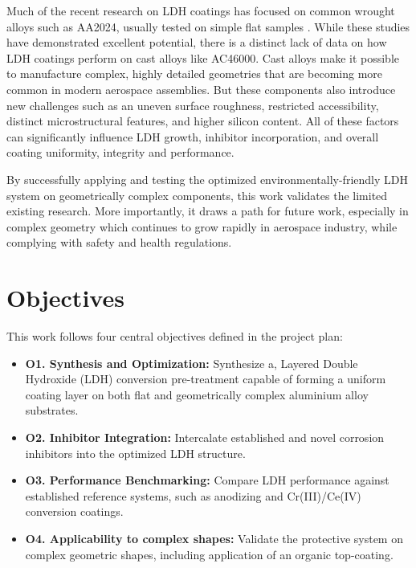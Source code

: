 \documentclass[11pt,twoside,a4paper]{report}
\begin{document}
Much of the recent research on LDH coatings has focused on common wrought alloys such as AA2024, usually tested on simple flat samples \cite{Tedim2014,Tedim2011,He2020,Bouali2020}. While these studies have demonstrated excellent potential, there is a distinct lack of data on how LDH coatings perform on cast alloys like AC46000. Cast alloys make it possible to manufacture complex, highly detailed geometries that are becoming more common in modern aerospace assemblies. But these components also introduce new challenges such as an uneven surface roughness, restricted accessibility, distinct microstructural features, and higher silicon content. All of these factors can significantly influence LDH growth, inhibitor incorporation, and overall coating uniformity, integrity and performance.

By successfully applying and testing the optimized environmentally-friendly LDH system on geometrically complex components, this work validates the limited existing research. More importantly, it draws a path for future work, especially in complex geometry which continues to grow rapidly in aerospace industry, while complying with safety and health regulations.

\section{Objectives}
This work follows four central objectives defined in the project plan:
\begin{itemize}
    \item \textbf{O1. Synthesis and Optimization:} Synthesize a, Layered Double Hydroxide (LDH) conversion pre-treatment capable of forming a uniform coating layer on both flat and geometrically complex aluminium alloy substrates.
    
    \item \textbf{O2. Inhibitor Integration:} Intercalate established and novel corrosion inhibitors into the optimized LDH structure.
    
    \item \textbf{O3. Performance Benchmarking:} Compare LDH performance against established reference systems, such as anodizing and Cr(III)/Ce(IV) conversion coatings.
    
    \item \textbf{O4. Applicability to complex shapes:} Validate the protective system on complex geometric shapes, including application of an organic top-coating.
\end{itemize}
\end{document}
